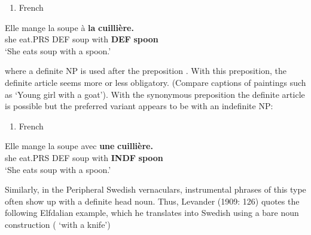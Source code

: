 \begin{enumerate} %
\item 
French

\end{enumerate} %
\ea\label{}
\gll Elle  mange  la  soupe  à  \textbf{la} \textbf{cuillière.}\\


she  eat.PRS  DEF  soup  with  \textbf{DEF} \textbf{spoon}\\ %


‘She eats soup with a spoon.’
\z


where a definite NP is used after the preposition . With this preposition, the definite article seems more or less obligatory. (Compare captions of paintings such as  ‘Young girl with a goat’). With the synonymous preposition  the definite article is possible but the preferred variant appears to be with an indefinite NP:

\begin{enumerate} %
\item 
French

\end{enumerate} %
\ea\label{}
\gll Elle  mange  la  soupe  avec  \textbf{une} \textbf{cuillière.}\\


she  eat.PRS  DEF  soup  with  \textbf{INDF} \textbf{spoon}\\ %


‘She eats soup with a spoon.’
\z


Similarly, in the Peripheral Swedish vernaculars, instrumental phrases of this type often show up with a definite head noun. Thus, Levander (1909: 126) quotes the following Elfdalian example, which he translates into Swedish using a bare noun construction ( ‘with a knife’)

